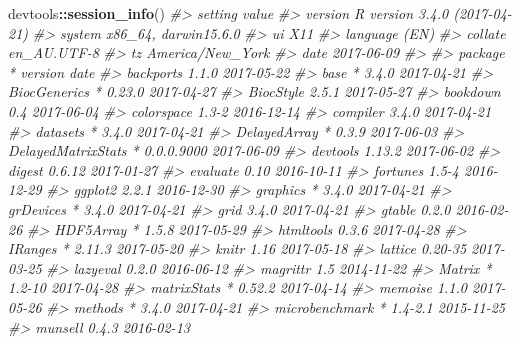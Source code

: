 \documentclass[]{book}
\newenvironment{Shaded}{\begin{snugshade}}{\end{snugshade}}
\newcommand{\KeywordTok}[1]{\textcolor[rgb]{0.13,0.29,0.53}{\textbf{#1}}}
\newcommand{\CommentTok}[1]{\textcolor[rgb]{0.56,0.35,0.01}{\textit{#1}}}
\newcommand{\OperatorTok}[1]{\textcolor[rgb]{0.81,0.36,0.00}{\textbf{#1}}}
\newcommand{\NormalTok}[1]{#1}
\begin{document}
\begin{Shaded}
\begin{Highlighting}[]
\NormalTok{devtools}\OperatorTok{::}\KeywordTok{session_info}\NormalTok{()}
\CommentTok{#>  setting  value                       }
\CommentTok{#>  version  R version 3.4.0 (2017-04-21)}
\CommentTok{#>  system   x86_64, darwin15.6.0        }
\CommentTok{#>  ui       X11                         }
\CommentTok{#>  language (EN)                        }
\CommentTok{#>  collate  en_AU.UTF-8                 }
\CommentTok{#>  tz       America/New_York            }
\CommentTok{#>  date     2017-06-09                  }
\CommentTok{#> }
\CommentTok{#>  package            * version    date      }
\CommentTok{#>  backports            1.1.0      2017-05-22}
\CommentTok{#>  base               * 3.4.0      2017-04-21}
\CommentTok{#>  BiocGenerics       * 0.23.0     2017-04-27}
\CommentTok{#>  BiocStyle            2.5.1      2017-05-27}
\CommentTok{#>  bookdown             0.4        2017-06-04}
\CommentTok{#>  colorspace           1.3-2      2016-12-14}
\CommentTok{#>  compiler             3.4.0      2017-04-21}
\CommentTok{#>  datasets           * 3.4.0      2017-04-21}
\CommentTok{#>  DelayedArray       * 0.3.9      2017-06-03}
\CommentTok{#>  DelayedMatrixStats * 0.0.0.9000 2017-06-09}
\CommentTok{#>  devtools             1.13.2     2017-06-02}
\CommentTok{#>  digest               0.6.12     2017-01-27}
\CommentTok{#>  evaluate             0.10       2016-10-11}
\CommentTok{#>  fortunes             1.5-4      2016-12-29}
\CommentTok{#>  ggplot2              2.2.1      2016-12-30}
\CommentTok{#>  graphics           * 3.4.0      2017-04-21}
\CommentTok{#>  grDevices          * 3.4.0      2017-04-21}
\CommentTok{#>  grid                 3.4.0      2017-04-21}
\CommentTok{#>  gtable               0.2.0      2016-02-26}
\CommentTok{#>  HDF5Array          * 1.5.8      2017-05-29}
\CommentTok{#>  htmltools            0.3.6      2017-04-28}
\CommentTok{#>  IRanges            * 2.11.3     2017-05-20}
\CommentTok{#>  knitr                1.16       2017-05-18}
\CommentTok{#>  lattice              0.20-35    2017-03-25}
\CommentTok{#>  lazyeval             0.2.0      2016-06-12}
\CommentTok{#>  magrittr             1.5        2014-11-22}
\CommentTok{#>  Matrix             * 1.2-10     2017-04-28}
\CommentTok{#>  matrixStats        * 0.52.2     2017-04-14}
\CommentTok{#>  memoise              1.1.0      2017-05-26}
\CommentTok{#>  methods            * 3.4.0      2017-04-21}
\CommentTok{#>  microbenchmark     * 1.4-2.1    2015-11-25}
\CommentTok{#>  munsell              0.4.3      2016-02-13}

\end{Highlighting}
\end{Shaded}
\end{document}
